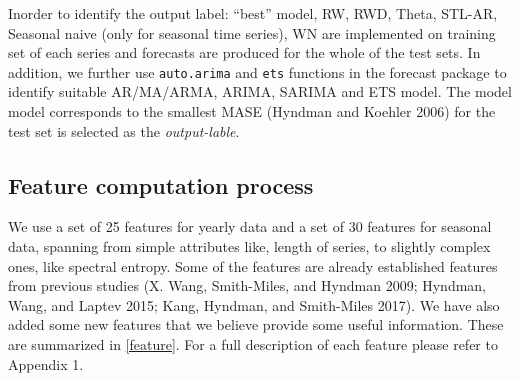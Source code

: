 \documentclass[11pt,]{article}
\theoremstyle{definition}
\theoremstyle{definition}
\theoremstyle{definition}
\theoremstyle{remark}
\begin{document}
Inorder to identify the output label: ``best'' model, RW, RWD, Theta,
STL-AR, Seasonal naive (only for seasonal time series), WN are
implemented on training set of each series and forecasts are produced
for the whole of the test sets. In addition, we further use
\texttt{auto.arima} and \texttt{ets} functions in the forecast package
to identify suitable AR/MA/ARMA, ARIMA, SARIMA and ETS model. The model
model corresponds to the smallest MASE (Hyndman and Koehler 2006) for
the test set is selected as the \emph{output-lable}.

\subsection{Feature computation
process}\label{feature-computation-process}

\label{sec:features}

We use a set of 25 features for yearly data and a set of 30 features for
seasonal data, spanning from simple attributes like, length of series,
to slightly complex ones, like spectral entropy. Some of the features
are already established features from previous studies (X. Wang,
Smith-Miles, and Hyndman 2009; Hyndman, Wang, and Laptev 2015; Kang,
Hyndman, and Smith-Miles 2017). We have also added some new features
that we believe provide some useful information. These are summarized in
\autoref{feature}. For a full description of each feature please refer
to Appendix 1.

\newpage

\newcommand{\boxedcheckmark}
  {{\ooalign{$\Box$\cr\hidewidth$\checkmark$\hidewidth}}}
\end{document}
